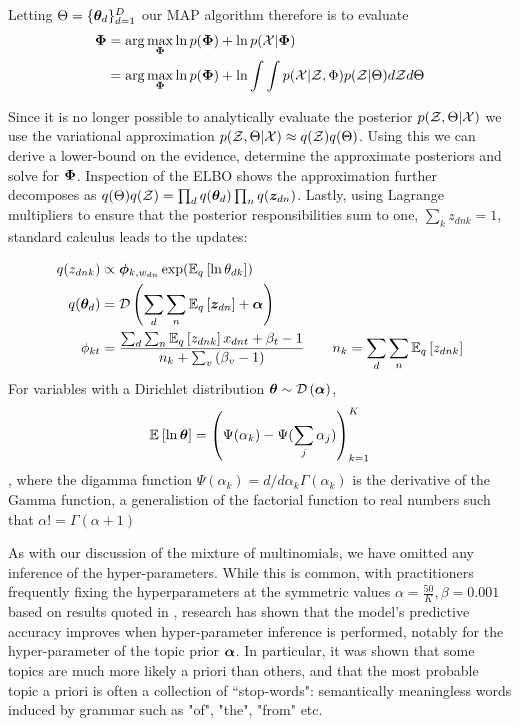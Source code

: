 Letting $\Theta = \{ \thd \}_{d=1}^D$ our MAP algorithm therefore is to evaluate
\begin{align}
\begin{split}
\params 
    &= \arg \max_\params \ln p(\params) + \ln p(\xdat|\params) \\
    &= \arg \max_\params \ln p(\params) + \ln \int \int p(\xdat|\zdat, \Phi)p(\zdat|\Theta) d\zdat d\Theta \label{eqn:vem-lda-problem}
\end{split}
\end{align}

Since it is no longer possible to analytically evaluate the posterior $p(\zdat, \Theta | \xdat)$ we use the variational approximation $p(\zdat, \Theta | \xdat) \approx  q(\zdat)q(\Theta)$. Using this we can derive a lower-bound on the evidence, determine the approximate posteriors and solve for $\params$. Inspection of the ELBO shows the approximation further decomposes as $q(\Theta)q(\zdat) = \prod_d q(\thd)\prod_n q(\zdn)$. Lastly, using Lagrange multipliers to ensure that the posterior responsibilities sum to one, $\sum_k z_{dnk} = 1$, standard calculus leads to the updates:

\begin{align}
q(\zdnk) & \propto \param_{k,w_{dn}}\exp(\ex{\ln \theta_{dk}}{q}) \\
q(\thd) &=  \dir{\sum_d \sum_n \ex{\zdn}{q} + \vv{\alpha}} \\
\phi_{kt} & =
    \frac{
        \sum_d \sum_n \ex{\zdnk}{q}x_{dnt} + \beta_t - 1
    }{
        n_k + \sum_v \left( \beta_v - 1 \right)
    } \qquad n_k = \sum_d \sum_n \ex{z_{dnk}}{q}
\end{align}
For variables with a Dirichlet distribution $\vv{\theta} \sim \dir{\vv{\alpha}}$, \begin{equation}\ex{\ln \vv{\theta}}{} = \left(\Psi(\alpha_k) - \Psi (\sum_j \alpha_j)\right)_{k=1}^K\end{equation}, where the digamma function $\Psi(\alpha_k) = d/d\alpha_k \Gamma(\alpha_k)$ is the derivative of the Gamma function, a generalistion of the factorial function to real numbers such that $\alpha! = \Gamma(\alpha + 1)$

As with our discussion of the mixture of multinomials, we have omitted any inference of the hyper-parameters. While this is common, with practitioners frequently fixing the hyperparameters at the symmetric values $\alpha = \frac{50}{K}, \beta=0.001$ based on results quoted in \cite{Griffiths2004}, research has shown\cite{Wallach2009a} that the model's predictive accuracy improves when hyper-parameter inference is performed, notably for the hyper-parameter of the topic prior $\vv{\alpha}$. In particular, it was shown that some topics are much more likely a priori than others, and that the most probable topic a priori is often a collection of ``stop-words": semantically meaningless words induced by grammar such as "of", "the", "from" etc.

